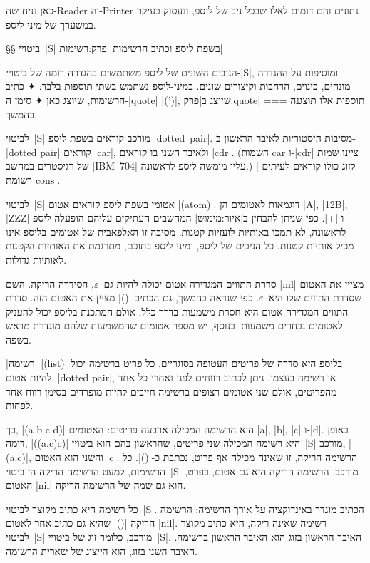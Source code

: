 כאן נניח שה-Reader וה-Printer נתונים והם דומים לאלו שבכל ניב של ליספ, ונעסוק
בעיקר במשערך של מיני-ליספ.


§§ ביטויי~\E|S| בשפת ליספ וכתיב הרשימות
|פרק:רשימות|

הניבים השונים של ליספ משתמשים בהגדרה דומה של ביטויי-\E|S|, ומוסיפות על ההגדרה
מונחים, כינוים, הרחבות וקיצורים שונים. במיני-ליספ נשתמש בשתי תוספות בלבד:
✦ כתיב הרשימות, שיוצג כאן
✦ סימן ה-\E|quote| \E|(')|, שיוצג ב|פרק:quote|
===
תוספות אלו תוצגנה בהמשך.

לביטוי~\E|S| מורכב קוראים בשפת ליספ \E|dotted~pair|. מסיבות היסטוריות לאיבר
הראשון ב-\E|dotted pair| קוראים \E|car|, ולאיבר השני בו קוראים \E|cdr|.
(השמות car ו-\E|cdr| ציינו שמות של רגיסטרים במחשב \E|IBM~704| עליו מומשה ליספ
לראשונה.) לזוג כולו קוראים לעיתים \ע|רשומת cons|.

לביטוי~\E|S| אטומי בשפת ליספ קוראים אטום \E|(atom)|. דוגמאות לאטומים הן \E|A|,
\E|12B|, \E|ZZZ| ו-\E|+|. כפי שניתן להבחין ב|איור:מימוש| המחשבים העתיקים עליהם
הופעלה ליספ לראשונה, לא תמכו באותיות לועזיות קטנות. מסיבה זו האלפאבית של אטומים
בליספ אינו מכיל אותיות קטנות. כל הניבים של ליספ, ומיני-ליספ בתוכם, מתרגמת את
האותיות הקטנות לאותיות גדולות.

סדרת התווים המגדירה אטום יכולה להיות גם~$ε$, הסידרה הריקה. השם \E|nil| מציין את
האטום שסדרת התווים שלו היא~$ε$. כפי שנראה בהמשך, גם הכתיב \E|()| מציין את האטום
הזה. סדרת התווים המגדירה אטום היא חסרת משמעות בדרך כלל, אולם המתכנת בליספ יכול
להעניק לאטומים נבחרים משמעות. בנוסף, יש מספר אטומים שהמשמעות שלהם מוגדרת מראש
בשפה.

\ע|רשימה| \E|(list)| בליספ היא סדרה של פריטים העטופה בסוגריים. כל פריט ברשימה
יכול להיות אטום, \E|dotted pair|, או רשימה בעצמו. ניתן לכתוב רווחים לפני ואחרי
כל אחד מהפריטים, אולם שני אטומים רצופים ברשימה חייבים להיות מופרדים בסימן רווח
אחד לפחות.

כך, \E|(a b c d)| היא הרשימה המכילה ארבעה פריטים: האטומים \E|a|, \E|b|, \E|c|
ו-\E|d|. באופן דומה, \E|((a.c)c)| היא רשימה המכילה שני פריטים, שהראשון בהם הוא
ביטויי~\E|S| מורכב, \E|(a.c)|, והשני הוא האטום \E|c|. הרשימה הריקה, זו שאינה
מכילה אף פריט, נכתבת כ-\E|()|. כל הרשימות, למעט הרשימה הריקה הן ביטוי~\E|S|
מורכב. הרשימה הריקה היא גם אטום, בפרט, האטום \E|nil| הוא גם שמה של הרשימה
הריקה.

כל רשימה היא כתיב מקוצר לביטוי~\E|S|. הכתיב מוגדר באינדוקציה על אורך הרשימה:
הרשימה הריקה \E|()| שהיא גם כתיב אחר לאטום \E|nil|. רשימה שאינה ריקה, היא כתיב
מקוצר לביטוי~\E|S| מורכב, כלומר זוג של ביטויי~\E|S|. האיבר הראשון בזוג הוא
האיבר הראשון ברשימה. האיבר השני בזוג, הוא הייצוג של שארית הרשימה.

